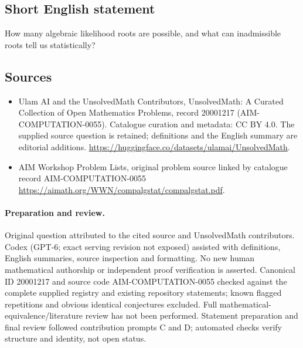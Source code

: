 \documentclass[11pt]{article}
\begin{document}
\subsection{Short English statement}
How many algebraic likelihood roots are possible, and what can inadmissible roots tell us statistically?
\subsection{Sources}
\begin{itemize}
\item[\hypertarget{source:20001217:1}{S1}] Ulam AI and the UnsolvedMath Contributors, UnsolvedMath: A Curated Collection of Open Mathematics Problems, record 20001217 (AIM-COMPUTATION-0055). Catalogue curation and metadata: CC BY 4.0. The supplied source question is retained; definitions and the English summary are editorial additions.
\url{https://huggingface.co/datasets/ulamai/UnsolvedMath}.
\item[\hypertarget{source:20001217:2}{S2}] AIM Workshop Problem Lists, original problem source linked by catalogue record AIM-COMPUTATION-0055
\url{https://aimath.org/WWN/compalgstat/compalgstat.pdf}.
\end{itemize}
\paragraph{Preparation and review.}
Original question attributed to the cited source and UnsolvedMath contributors. Codex (GPT-6; exact serving revision not exposed) assisted with definitions, English summaries, source inspection and formatting. No new human mathematical authorship or independent proof verification is asserted. Canonical ID 20001217 and source code AIM-COMPUTATION-0055 checked against the complete supplied registry and existing repository statements; known flagged repetitions and obvious identical conjectures excluded. Full mathematical-equivalence/literature review has not been performed. Statement preparation and final review followed contribution prompts C and D; automated checks verify structure and identity, not open status.
\label{end:20001217}
\end{document}
